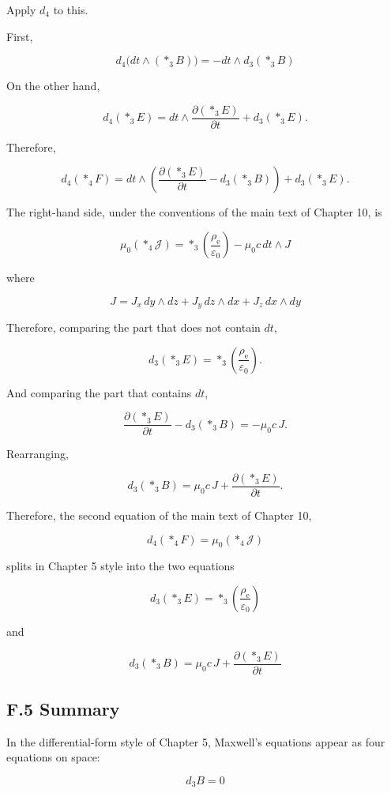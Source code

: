 Apply \(d_4\) to this.

First,

\[
d_4\bigl(dt\wedge(\ast_3B)\bigr)=-dt\wedge d_3(\ast_3B)
\]

On the other hand,

\[
d_4(\ast_3E)=dt\wedge\frac{\partial(\ast_3E)}{\partial t}+d_3(\ast_3E).
\]

Therefore,

\[
d_4(\ast_4F)=dt\wedge\left(\frac{\partial(\ast_3E)}{\partial t}-d_3(\ast_3B)\right)+d_3(\ast_3E).
\]

The right-hand side, under the conventions of the main text of Chapter
10, is

\[
\mu_0(\ast_4\mathcal J)=\ast_3\left(\frac{\rho_{\mathrm e}}{\varepsilon_0}\right)-\mu_0 c\,dt\wedge J
\]

where

\[
J=J_x\,dy\wedge dz+J_y\,dz\wedge dx+J_z\,dx\wedge dy
\]

Therefore, comparing the part that does not contain \(dt\),

\[
d_3(\ast_3E)=\ast_3\left(\frac{\rho_{\mathrm e}}{\varepsilon_0}\right).
\]

And comparing the part that contains \(dt\),

\[
\frac{\partial(\ast_3E)}{\partial t}-d_3(\ast_3B)=-\mu_0 c\,J.
\]

Rearranging,

\[
d_3(\ast_3B)=\mu_0 c\,J+\frac{\partial(\ast_3E)}{\partial t}.
\]

Therefore, the second equation of the main text of Chapter 10,

\[
d_4(\ast_4F)=\mu_0(\ast_4\mathcal J)
\]

splits in Chapter 5 style into the two equations

\[
d_3(\ast_3E)=\ast_3\left(\frac{\rho_{\mathrm e}}{\varepsilon_0}\right)
\]

and

\[
d_3(\ast_3B)=\mu_0 c\,J+\frac{\partial(\ast_3E)}{\partial t}
\]

\hypertarget{f.5-summary}{%
\subsection{F.5 Summary}\label{f.5-summary}}

In the differential-form style of Chapter 5, Maxwell's equations appear
as four equations on space:

\[
d_3B=0
\]

